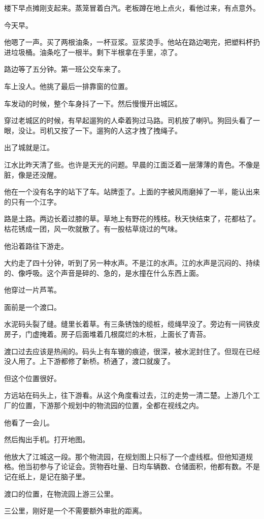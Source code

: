 \documentclass[UTF8,a5paper,11pt,openany]{ctexbook}
\begin{document}
楼下早点摊刚支起来。蒸笼冒着白汽。老板蹲在地上点火，看他过来，有点意外。

今天早。

他嗯了一声。买了两根油条，一杯豆浆。豆浆烫手。他站在路边喝完，把塑料杯扔进垃圾桶。油条吃了一根半。剩下半根拿在手里，凉了。

路边等了五分钟。第一班公交车来了。

车上没人。他挑了最后一排靠窗的位置。

车发动的时候，整个车身抖了一下。然后慢慢开出城区。

穿过老城区的时候，有早起遛狗的人牵着狗过马路。司机按了喇叭。狗回头看了一眼，没让。司机又按了一下。遛狗的人这才拽了拽绳子。

出了城就是江。

江水比昨天清了些。也许是天光的问题。早晨的江面泛着一层薄薄的青色。不像是脏，像是还没醒。

他在一个没有名字的站下了车。站牌歪了。上面的字被风雨磨掉了一半，能认出来的只有一个江字。

路是土路。两边长着过膝的草。草地上有野花的残枝。秋天快结束了，花都枯了。枯花锈成一团，风一吹就散了。有一股枯草烧过的气味。

他沿着路往下游走。

大约走了四十分钟，听到了另一种水声。不是江的水声。江的水声是沉闷的、持续的、像呼吸。这个声音是碎的、急的，是水撞在什么东西上面。

他穿过一片芦苇。

面前是一个渡口。

水泥码头裂了缝。缝里长着草。有三条锈蚀的缆桩，缆绳早没了。旁边有一间铁皮房子，门虚掩着。房子后面堆着几根腐烂的木桩，上面长了青苔。

渡口过去应该是热闹的。码头上有车辙的痕迹，很深，被水泥封住了。但现在已经没人用了。上下游都修了新桥。桥通了，渡口就废了。

但这个位置很好。

方远站在码头上，往下游看。从这个角度看过去，江的走势一清二楚。上游几个工厂的位置，下游那个规划中的物流园的位置，全都在视线之内。

他看了一会儿。

然后掏出手机。打开地图。

他放大了江城这一段。那个物流园，在规划图上只标了一个虚线框。但他知道规格。他当初参与了论证会。货物吞吐量、日均车辆数、仓储面积，他都有数。不是记在纸上，是记在脑子里。

渡口的位置，在物流园上游三公里。

三公里，刚好是一个不需要额外审批的距离。
\end{document}
